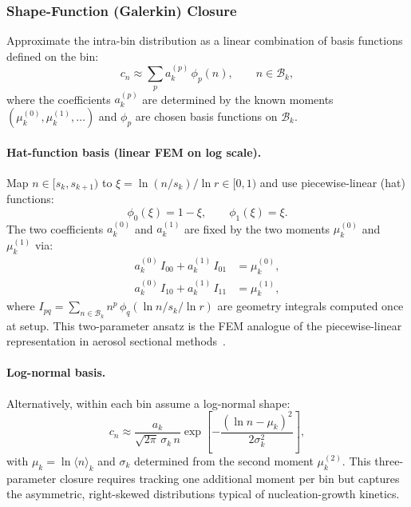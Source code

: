 \subsubsection{Shape-Function (Galerkin) Closure}
\label{sec:fem_closure}

Approximate the intra-bin distribution as a linear combination of
basis functions defined on the bin:
\begin{equation}\label{eq:shape_ansatz}
    c_n \approx \sum_{p} a_k^{(p)}\,\phi_p(n),
    \qquad n \in \mathcal{B}_k,
\end{equation}
where the coefficients $a_k^{(p)}$ are determined by the known
moments $(\mu_k^{(0)}, \mu_k^{(1)}, \ldots)$ and
$\phi_p$ are chosen basis functions on $\mathcal{B}_k$.

\paragraph{Hat-function basis (linear FEM on log scale).}
Map $n \in [s_k, s_{k+1})$ to $\xi = \ln(n/s_k)/\ln r \in [0,1)$
and use piecewise-linear (hat) functions:
\begin{equation}\label{eq:hat_basis}
    \phi_0(\xi) = 1 - \xi, \qquad \phi_1(\xi) = \xi.
\end{equation}
The two coefficients $a_k^{(0)}$ and $a_k^{(1)}$ are fixed by the
two moments $\mu_k^{(0)}$ and $\mu_k^{(1)}$ via:
\begin{align}
    a_k^{(0)}\,I_{00} + a_k^{(1)}\,I_{01} &= \mu_k^{(0)},
    \label{eq:hat_moment0}\\
    a_k^{(0)}\,I_{10} + a_k^{(1)}\,I_{11} &= \mu_k^{(1)},
    \label{eq:hat_moment1}
\end{align}
where $I_{pq} = \sum_{n \in \mathcal{B}_k} n^p\,\phi_q(\ln n/s_k/\ln r)$
are geometry integrals computed once at setup. This two-parameter
ansatz is the FEM analogue of the piecewise-linear representation in
aerosol sectional methods~\cite{Adams2002,Jacobson1994}.

\paragraph{Log-normal basis.}
Alternatively, within each bin assume a log-normal shape:
\begin{equation}\label{eq:lognormal_ansatz}
    c_n \approx \frac{a_k}{\sqrt{2\pi}\,\sigma_k\,n}
    \exp\!\left[-\frac{(\ln n - \mu_k)^2}{2\sigma_k^2}\right],
\end{equation}
with $\mu_k = \ln\langle n\rangle_k$ and $\sigma_k$ determined from
the second moment $\mu_k^{(2)}$. This three-parameter closure
requires tracking one additional moment per bin but captures the
asymmetric, right-skewed distributions typical of nucleation-growth
kinetics.


